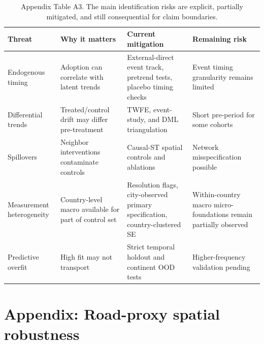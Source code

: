 \documentclass[11pt,a4paper]{article}
\begin{document}
\begin{table}[H]
\centering
\caption{Appendix Table A3. The main identification risks are explicit, partially mitigated, and still consequential for claim boundaries.}
\label{tab:threat_matrix_appendix}
\small
\setlength{\tabcolsep}{4pt}
\begin{tabular}{p{}p{}p{}p{}}
\toprule
Threat & Why it matters & Current mitigation & Remaining risk \\
\midrule
Endogenous timing & Adoption can correlate with latent trends & External-direct event track, pretrend tests, placebo timing checks & Event timing granularity remains limited \\
Differential trends & Treated/control drift may differ pre-treatment & TWFE, event-study, and DML triangulation & Short pre-period for some cohorts \\
Spillovers & Neighbor interventions contaminate controls & Causal-ST spatial controls and ablations & Network misspecification possible \\
Measurement heterogeneity & Country-level macro available for part of control set & Resolution flags, city-observed primary specification, country-clustered SE & Within-country macro micro-foundations remain partially observed \\
Predictive overfit & High fit may not transport & Strict temporal holdout and continent OOD tests & Higher-frequency validation pending \\
\bottomrule
\end{tabular}
\end{table}
\FloatBarrier

\section{Appendix: Road-proxy spatial robustness}
\label{app:road_proxy}
\end{document}
